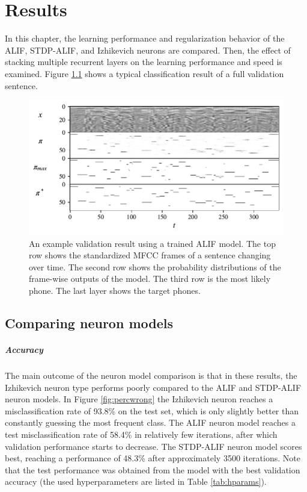 \chapter{Results}\label{ch:results}
In this chapter, the learning performance and regularization behavior of the ALIF, STDP-ALIF, and Izhikevich neurons are compared.
Then, the effect of stacking multiple recurrent layers on the learning performance and speed is examined.
Figure \ref{fig:inoutpair} shows a typical classification result of a full validation sentence.

	\begin{figure}[ht]
	    \myfloatalign
	    \includegraphics[width=\linewidth]{gfx/InOutPair}
	    \caption[Input/output/target example]{An example validation result using a trained ALIF model. The top row shows the standardized MFCC frames of a sentence changing over time. The second row shows the probability distributions of the frame-wise outputs of the model. The third row is the most likely phone. The last layer shows the target phones.}
	    \label{fig:inoutpair}
	  \end{figure}

\section{Comparing neuron models}
	\paragraph{Accuracy}
		The main outcome of the neuron model comparison is that in these results, the Izhikevich neuron type performs poorly compared to the ALIF and STDP-ALIF neuron models.
		In Figure \ref{fig:percwrong} the Izhikevich neuron reaches a misclassification rate of 93.8\% on the test set, which is only slightly better than constantly guessing the most frequent class.
		The ALIF neuron model reaches a test misclassification rate of 58.4\% in relatively few iterations, after which validation performance starts to decrease.
		The STDP-ALIF neuron model scores best, reaching a performance of 48.3\% after approximately 3500 iterations.
		Note that the test performance was obtained from the model with the best validation accuracy (the used hyperparameters are listed in Table \ref{tab:hparams}).

